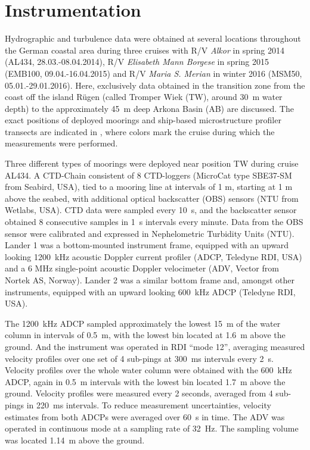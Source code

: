 \section{Instrumentation}

Hydrographic and turbulence data were obtained at several locations throughout 
the 
German coastal area during three cruises with R/V \textit{Alkor} in spring 2014 
(AL434, 28.03.-08.04.2014), R/V \textit{Elisabeth Mann Borgese} in spring 2015 
(EMB100, 09.04.-16.04.2015) and R/V \textit{Maria S. Merian} in winter 2016 
(MSM50, 05.01.-29.01.2016). Here, exclusively data obtained in the 
transition zone from the coast off 
the island R\"{u}gen (called Tromper Wiek (TW), around 30~m water depth) to 
the approximately 45~m deep Arkona Basin (AB) are discussed. The exact 
positions of deployed 
moorings and ship-based microstructure profiler transects are indicated in 
, where colors mark the cruise during which the measurements 
were performed.

Three different types of moorings were deployed near position TW during cruise 
AL434. A CTD-Chain consistent of 8 CTD-loggers (MicroCat type SBE37-SM from 
Seabird, USA), tied to a mooring line at intervals of 1 m, starting at 1 m above 
the seabed, with additional optical backscatter (OBS) sensors (NTU from 
Wetlabs, USA). CTD data were sampled every 10~s, and the backscatter sensor 
obtained 8 consecutive samples in 1~s intervals every minute. Data from the OBS 
sensor were calibrated and expressed in Nephelometric Turbidity Units (NTU).
Lander 1 was a bottom-mounted instrument frame, equipped with an upward looking 
1200~kHz acoustic Doppler current profiler (ADCP, Teledyne RDI, USA) and a 6 
MHz single-point acoustic Doppler velocimeter (ADV, Vector from Nortek AS, 
Norway).
Lander 2 was a similar bottom frame and, amongst other instruments, equipped 
with an upward looking 600~kHz ADCP (Teledyne RDI, USA).

The 1200~kHz ADCP sampled approximately the lowest 15~m of the water column in 
intervals of 0.5~m, with the lowest bin located at 1.6~m above the ground. 
And the instrument was operated in RDI ``mode 12'', 
averaging measured velocity profiles over one set of 4 sub-pings at 300~ms 
intervals every 2~s. 
Velocity profiles over the whole water column were 
obtained with the 600~kHz ADCP, again in 0.5~m intervals with the lowest bin 
located 1.7~m above the ground. Velocity profiles were measured every 2 
seconds, 
averaged from 4 sub-pings in 220~ms intervals. To reduce measurement 
uncertainties, velocity estimates from both ADCPs were averaged over 60~s in 
time. 
The ADV was operated in continuous mode at a sampling rate of 32~Hz. The 
sampling volume was located 1.14~m above the ground.

